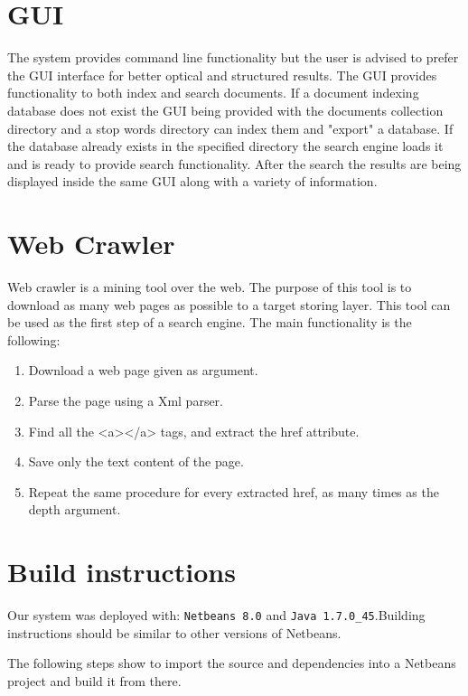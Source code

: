 \documentclass[letterpaper,twocolumn,10pt]{article}
\begin{document}
\section{GUI}
The system provides command line functionality but the user is advised to prefer the GUI interface for better optical and structured results. The GUI provides functionality to both index and search documents. If a document indexing database does not exist the GUI being provided with the documents collection directory and a stop words directory can index them and "export" a database. If the database already exists in the specified directory the search engine loads it and is ready to provide search functionality. After the search the results are being displayed inside the same GUI along with a variety of information.

\section{Web Crawler}
Web crawler is a mining tool over the web. The purpose of this tool is to download as many web pages as possible to a target storing layer. This tool can be used as the first step of a search engine. The main functionality is the following:
\begin{enumerate}
  \item Download a web page given as argument.
  \item Parse the page using a Xml parser.
  \item Find all the <a></a> tags, and extract the href attribute.
  \item Save only the text content of the page.
  \item Repeat the same procedure for every extracted href, as many times as the depth argument.
\end{enumerate}

\section{Build instructions}
Our system was deployed with: {\tt Netbeans 8.0} and {\tt Java 1.7.0\_45}.Building instructions should be similar to other versions of Netbeans.

The following steps show to import the source and dependencies into a Netbeans project and build it from there.
\end{document}
